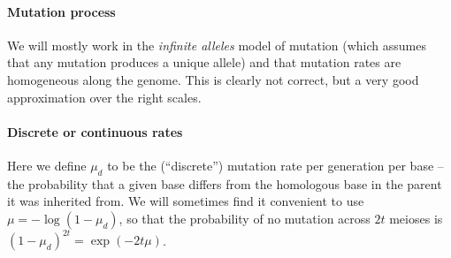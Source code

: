 \paragraph{Mutation process}
  We will mostly work in the \emph{infinite alleles} model of mutation
  (which assumes that any mutation produces a unique allele)
  and that mutation rates are homogeneous along the genome.
  This is clearly not correct, but a very good approximation over the right scales.


\paragraph{Discrete or continuous rates}
  Here we define $\mu_d$ to be the (``discrete'') mutation rate per generation per base 
  -- the probability that a given base differs from the homologous base in the parent it was inherited from.
  We will sometimes find it convenient to use $\mu = -\log(1-\mu_d)$,
  so that the probability of no mutation across $2t$ meioses is $(1-\mu_d)^{2t} = \exp(-2 t \mu )$.


